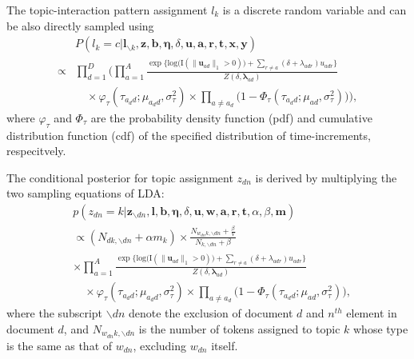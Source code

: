 \documentclass{article}
\begin{document}
The topic-interaction pattern assignment $l_k$ is a discrete random variable and can be also directly sampled using
       \begin{equation}
       \begin{aligned} & 
       P(l_k=c|\boldsymbol{l}_{\backslash k}, \boldsymbol{z}, \boldsymbol{b},\boldsymbol{\eta}, \delta, \boldsymbol{u}, \boldsymbol{a}, \boldsymbol{r}, \boldsymbol{t}, \boldsymbol{x},  \boldsymbol{y})\\
     \propto   &\prod_{d=1}^D\Big(
       \prod_{a=1}^A \frac{\exp\Big\{\mbox{log}\big(\text{I}( \lVert \boldsymbol{u}_{ad}\rVert_1 > 0)\big) + \sum\limits_{r \neq a} (\delta+\lambda_{adr})u_{adr}\Big\}}{Z(\delta,\boldsymbol{\lambda}_{ad})}
       \\&\quad\times\varphi_{\tau}(\tau_{a_d d}; \mu_{a_d d}, \sigma_\tau^2)\times \prod_{a\neq a_d}\big(1-\Phi_{\tau}(\tau_{a_d d}; \mu_{a d}, \sigma_\tau^2) \big)\Big),
       \end{aligned}
       \end{equation}
where $\varphi_\tau$ and $\Phi_\tau$ are the probability density function (pdf) and cumulative distribution function (cdf) of the specified distribution of time-increments, respecitvely. 

The conditional posterior for topic assignment $z_{dn}$ is derived by multiplying the two sampling equations of LDA:
  	   \begin{equation}
  	   \begin{aligned}
  	   &p(z_{dn}=k| \boldsymbol{z}_{\backslash dn}, \boldsymbol{l}, \boldsymbol{b},\boldsymbol{\eta}, \delta, \boldsymbol{u}, \boldsymbol{w}, \boldsymbol{a}, \boldsymbol{r}, \boldsymbol{t}, \alpha, \beta, \boldsymbol{m})\\&\propto
  	   ({N_{dk, \backslash dn}+\alpha m_k})\times 	  \frac{N_{w_{dn}k, \backslash dn}+\frac{\beta}{V}}{N_{k, \backslash dn}+\beta}
  	   \\&  \times \prod_{a=1}^A \frac{\exp\Big\{\mbox{log}\big(\text{I}( \lVert \boldsymbol{u}_{ad}\rVert_1 > 0)\big) + \sum\limits_{r\neq a} (\delta+\lambda_{adr})u_{adr}\Big\}}{Z(\delta,\boldsymbol{\lambda}_{ad})}
  	   \\&\quad\times\varphi_{\tau}(\tau_{a_d d}; \mu_{a_d d}, \sigma_\tau^2)\times \prod_{a\neq a_d}\big(1-\Phi_{\tau}(\tau_{a_d d}; \mu_{a d}, \sigma_\tau^2) \big),
  	   \end{aligned}
  	   \end{equation}
  	   where the subscript $\backslash dn$ denote the exclusion of document $d$ and $n^{th}$ element in document $d$, and $N_{w_{dn}k, \backslash dn}$ is the number of tokens assigned to topic $k$ whose type is the same as that of $w_{dn}$, excluding $w_{dn}$ itself. 
  	   
\end{document}
